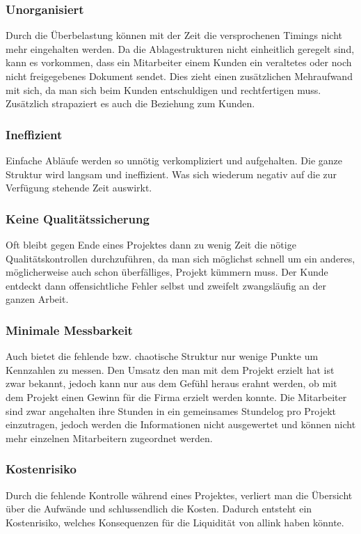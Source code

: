 \subsubsection{Unorganisiert}
Durch die Überbelastung können mit der Zeit die versprochenen Timings
nicht mehr eingehalten werden. Da die Ablagestrukturen nicht einheitlich geregelt
sind, kann es vorkommen, dass ein Mitarbeiter einem Kunden ein veraltetes oder
noch nicht freigegebenes Dokument sendet. Dies zieht einen zusätzlichen 
Mehraufwand mit sich, da man sich beim Kunden entschuldigen und rechtfertigen
muss. Zusätzlich strapaziert es auch die Beziehung zum Kunden.

\subsubsection{Ineffizient}
Einfache Abläufe werden so unnötig verkompliziert und aufgehalten. Die ganze
Struktur wird langsam und ineffizient. Was sich wiederum negativ auf die zur
Verfügung stehende Zeit auswirkt.

\subsubsection{Keine Qualitätssicherung}
Oft bleibt gegen Ende eines Projektes dann zu wenig Zeit die nötige 
Qualitätskontrollen durchzuführen, da man sich möglichst schnell um ein anderes,
möglicherweise auch schon überfälliges, Projekt kümmern muss. Der Kunde entdeckt
dann offensichtliche Fehler selbst und zweifelt zwangsläufig an der ganzen Arbeit.

\subsubsection{Minimale Messbarkeit}
Auch bietet die fehlende bzw. chaotische Struktur nur wenige Punkte um Kennzahlen
zu messen. Den Umsatz den man mit dem Projekt erzielt hat ist zwar bekannt,
jedoch kann nur aus dem Gefühl heraus erahnt werden, ob mit dem Projekt einen
Gewinn für die Firma erzielt werden konnte. Die Mitarbeiter sind zwar angehalten
ihre Stunden in ein gemeinsames Stundelog pro Projekt einzutragen, jedoch werden
die Informationen nicht ausgewertet und können nicht mehr einzelnen Mitarbeitern
zugeordnet werden.

\subsubsection{Kostenrisiko}
Durch die fehlende Kontrolle während eines Projektes, verliert man die
Übersicht über die Aufwände und schlussendlich die Kosten. Dadurch entsteht
ein Kostenrisiko, welches Konsequenzen für die Liquidität von allink haben könnte.

